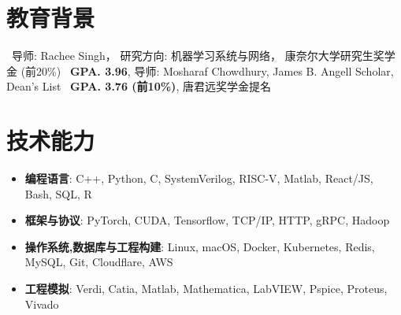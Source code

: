 \documentclass{resume}
\begin{document}


 

\section{教育背景}
\ 导师: Rachee Singh， 研究方向: 机器学习系统与网络， 康奈尔大学研究生奖学金 (前20\%)
\ \textbf{GPA. 3.96}, 导师: Mosharaf Chowdhury, James B. Angell Scholar, Dean's List
\ \textbf{GPA. 3.76 (前10\%)}, 唐君远奖学金提名

\section{技术能力}
\begin{itemize}[parsep=0.2ex]
  \item \textbf{编程语言}: C++, Python, C, SystemVerilog, RISC-V, Matlab, React/JS, Bash, SQL, R
  \item \textbf{框架与协议}: PyTorch, CUDA, Tensorflow, TCP/IP, HTTP, gRPC, Hadoop
  \item \textbf{操作系统,数据库与工程构建}: Linux, macOS, Docker, Kubernetes, Redis, MySQL, Git, Cloudflare, AWS
  \item \textbf{工程模拟}: Verdi, Catia, Matlab, Mathematica, LabVIEW, Pspice, Proteus, Vivado  
\end{itemize}
\end{document}
